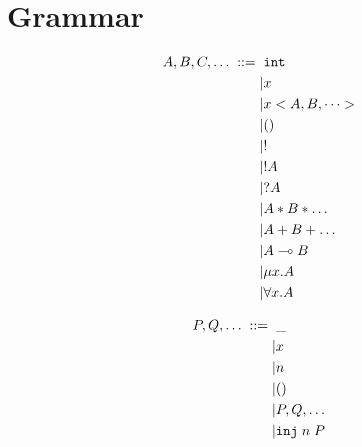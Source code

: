 \documentclass{scrartcl}
\begin{document}
\section{Grammar}

\begin{align*}
    A, B, C, \dots \; ::= \;\;
      & \verb?int?     \\
    | & x              \\
    | & x<A, B, \dots> \\
    | & ()             \\
    | & !              \\
    | & !A             \\
    | & ?A             \\
    | & A * B * \dots  \\
    | & A + B + \dots  \\
    | & A \multimap B  \\
    | & \mu x. A       \\
    | & \forall x. A   \\
\end{align*}

\begin{align*}
    P, Q, \dots \; ::= \;\;
      & \_               \\
    | & x                \\
    | & n                \\
    | & ()               \\
    | & P, Q, \dots      \\
    | & \verb?inj?\;n\;P \\
\end{align*}
\end{document}
